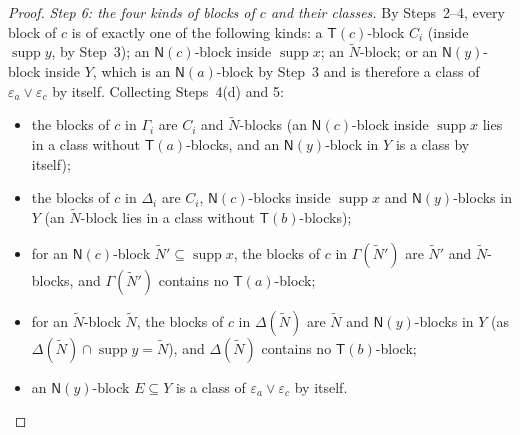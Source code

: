 \documentclass[11pt]{amsart}
\theoremstyle{definition}
\newcommand{\supp}{\operatorname{supp}}
\newcommand{\T}{\mathsf{T}}
\newcommand{\N}{\mathsf{N}}
\begin{document}
\begin{proof}
\emph{Step 6: the four kinds of blocks of $c$ and their classes.} By Steps~2--4, every block of $c$ is of exactly one of the following kinds: a $\T(c)$-block $C_i$ (inside $\supp y$, by Step~3); an $\N(c)$-block inside $\supp x$; an $\tilde N$-block; or an $\N(y)$-block inside $Y$, which is an $\N(a)$-block by Step~3 and is therefore a class of $\varepsilon_a\vee\varepsilon_c$ by itself. Collecting Steps~4(d) and 5:
\begin{itemize}[nosep]
\item[(1)] the blocks of $c$ in $\Gamma_i$ are $C_i$ and $\tilde N$-blocks (an $\N(c)$-block inside $\supp x$ lies in a class without $\T(a)$-blocks, and an $\N(y)$-block in $Y$ is a class by itself);
\item[(2)] the blocks of $c$ in $\Delta_i$ are $C_i$, $\N(c)$-blocks inside $\supp x$ and $\N(y)$-blocks in $Y$ (an $\tilde N$-block lies in a class without $\T(b)$-blocks);
\item[(3)] for an $\N(c)$-block $\tilde N'\subseteq\supp x$, the blocks of $c$ in $\Gamma(\tilde N')$ are $\tilde N'$ and $\tilde N$-blocks, and $\Gamma(\tilde N')$ contains no $\T(a)$-block;
\item[(4)] for an $\tilde N$-block $\tilde N$, the blocks of $c$ in $\Delta(\tilde N)$ are $\tilde N$ and $\N(y)$-blocks in $Y$ (as $\Delta(\tilde N)\cap\supp y=\tilde N$), and $\Delta(\tilde N)$ contains no $\T(b)$-block;
\item[(5)] an $\N(y)$-block $E\subseteq Y$ is a class of $\varepsilon_a\vee\varepsilon_c$ by itself.
\end{itemize}


\end{proof}
\end{document}
